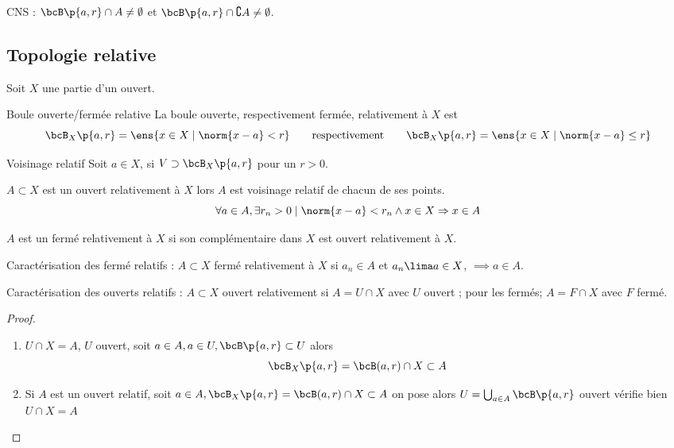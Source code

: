 \documentclass[a4paper,french,bookmarks]{book}
\begin{document}
    CNS : $\bcB\p{a, r} \cap A \neq\emptyset$ et $\bcB\p{a, r} \cap \complement A \neq \emptyset$.

    \subsection{Topologie relative}
    
    Soit $X$ une partie d'un ouvert.
    
    \begin{definition}{Boule ouverte/fermée relative}{}
        La boule ouverte, respectivement fermée, relativement à  $X$ est 
        \[ \bcB_X\p{a,r} = \ens{x\in X \mid \norm{x-a} < r} \qquad\text{respectivement}\qquad
         \bcB_X\p{a,r} = \ens{x\in X \mid \norm{x-a} \leq r}\]
    \end{definition}
    
    \begin{definition}{Voisinage relatif}{}
        Soit $a \in X$, si $V \supset \bcB_X\p{a, r}$ pour un $r > 0$.
    \end{definition}

    \(A \subset X\) est un ouvert relativement à $X$ lors $A$ est voisinage relatif de chacun de ses points. 
    \[ \forall a \in A, \exists r_n > 0 \mid \norm{x-a} < r_n \land x \in X \Rightarrow x \in A\]
    
    $A$ est un fermé relativement à $X$ si son complémentaire dans $X$ est ouvert relativement à $X$.
    
    Caractérisation des fermé relatifs : $A \subset X$ fermé relativement à $X$ si $a_n \in A$ et $a_n \lima a \in X$, $\implies a \in A$.
    
    Caractérisation des ouverts relatifs : $A \subset X$ ouvert relativement si $A = U \cap X $ avec $U$ ouvert ; pour les fermés; $A = F \cap X$ avec $F$ fermé.
    
    \begin{proof}
        \begin{enumerate}
            \item \(U \cap X = A\), $U$ ouvert, soit \(a\in A, a \in U, \bcB\p{a,r} \subset U\) alors \[\bcB_X\p{a,r} = \bcB(a,r) \cap X \subset A\]
            \item Si $A$ est un ouvert relatif, soit $a\in A, \bcB_X\p{a,r} = \bcB(a,r) \cap X \subset A$ on pose alors $U = \bigcup_{a\in A} \bcB\p{a,r}$ ouvert vérifie bien \(U\cap X= A\)
        \end{enumerate}
        
    \end{proof}
    
\end{document}
